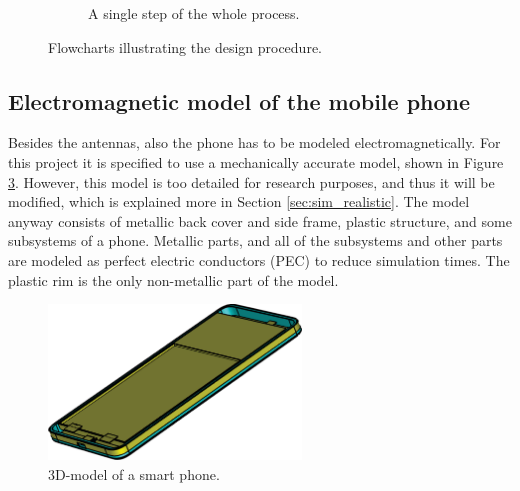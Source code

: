 \begin{figure}[H]
    \centering
    \ContinuedFloat
    \begin{subfigure}[b]{\textwidth}
        \caption{A single step of the whole process.}
        \label{fig:step}
    \end{subfigure}
    \caption{Flowcharts illustrating the design procedure.}
    \label{fig:flowcharts}
\end{figure}


\subsection{Electromagnetic model of the mobile phone}
\label{sec:phone}
Besides the antennas, also the phone has to be modeled electromagnetically. For this project it is specified to use a mechanically accurate model, shown in Figure \ref{fig:cad}. However, this model is too detailed for research purposes, and thus it will be modified, which is explained more in Section \ref{sec:sim_realistic}. The model anyway consists of metallic back cover and side frame, plastic structure, and some subsystems of a phone. Metallic parts, and all of the subsystems and other parts are modeled as perfect electric conductors (PEC) to reduce simulation times. The plastic rim is the only non-metallic part of the model.
\begin{figure}[H]
    \centering
    \includegraphics[width=0.6\textwidth]{img/cad.eps}
    \caption{3D-model of a smart phone.}
    \label{fig:cad}
\end{figure}

